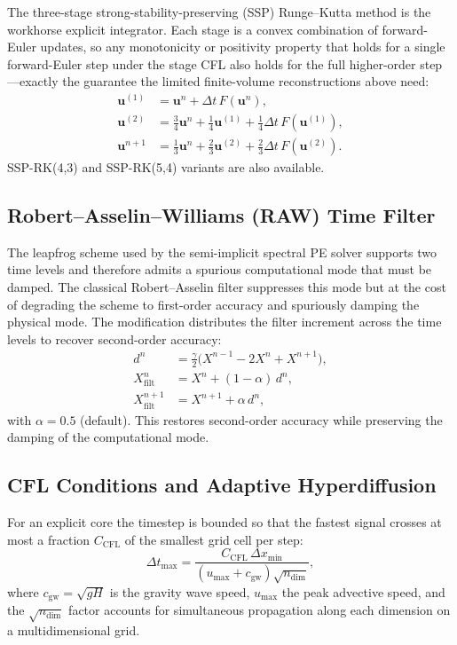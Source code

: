 \documentclass[11pt,twoside]{report}
\newcommand{\vect}[1]{\bm{#1}}
\begin{document}
The three-stage strong-stability-preserving (SSP) Runge--Kutta method
\citep{ShuOsher1988} is the workhorse explicit integrator. Each stage is a
convex combination of forward-Euler updates, so any monotonicity or
positivity property that holds for a single forward-Euler step under the
stage CFL also holds for the full higher-order step---exactly the guarantee the
limited finite-volume reconstructions above need:
\begin{align}
  \vect{u}^{(1)} &= \vect{u}^n + \Delta t\,F(\vect{u}^n), \\
  \vect{u}^{(2)} &= \tfrac{3}{4}\vect{u}^n + \tfrac{1}{4}\vect{u}^{(1)}
  + \tfrac{1}{4}\Delta t\,F(\vect{u}^{(1)}), \\
  \vect{u}^{n+1} &= \tfrac{1}{3}\vect{u}^n + \tfrac{2}{3}\vect{u}^{(2)}
  + \tfrac{2}{3}\Delta t\,F(\vect{u}^{(2)}).
\end{align}
SSP-RK(4,3) and SSP-RK(5,4) variants are also available.

\subsection{Robert--Asselin--Williams (RAW) Time Filter}

The leapfrog scheme used by the semi-implicit spectral PE solver supports two
time levels and therefore admits a spurious computational mode that must be
damped. The classical Robert--Asselin filter \citep{Asselin1972} suppresses
this mode but at the cost of degrading the scheme to first-order accuracy and
spuriously damping the physical mode. The \citet{Williams2009} modification
distributes the filter increment across the time levels to recover second-order
accuracy:
\begin{align}
  d^n &= \frac{\gamma}{2}\bigl(X^{n-1}-2X^n+X^{n+1}\bigr), \\
  X^n_{\mathrm{filt}} &= X^n + (1-\alpha)\,d^n, \\
  X^{n+1}_{\mathrm{filt}} &= X^{n+1} + \alpha\,d^n,
\end{align}
with $\alpha=0.5$ (default).  This restores second-order accuracy while
preserving the damping of the computational mode.

\subsection{CFL Conditions and Adaptive Hyperdiffusion}

For an explicit core the timestep is bounded so that the fastest signal
crosses at most a fraction $C_{\mathrm{CFL}}$ of the smallest grid cell per step:
\begin{equation}
  \Delta t_{\max} = \frac{C_{\mathrm{CFL}}\,\Delta x_{\min}}
  {(u_{\max}+c_{\mathrm{gw}})\sqrt{n_{\mathrm{dim}}}},
\end{equation}
where $c_{\mathrm{gw}}=\sqrt{gH}$ is the gravity wave speed, $u_{\max}$ the peak
advective speed, and the $\sqrt{n_{\mathrm{dim}}}$ factor accounts for
simultaneous propagation along each dimension on a multidimensional grid.
\end{document}
